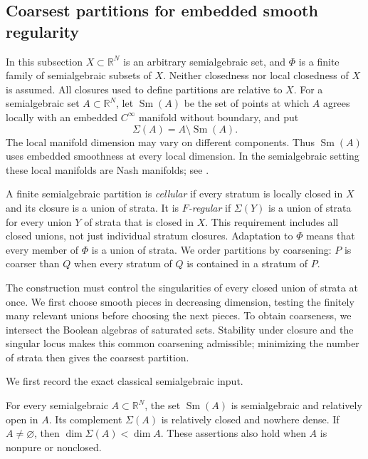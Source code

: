 \subsection{Coarsest partitions for embedded smooth regularity}
\label{subsec:coarsest-embedded-smooth-partitions}

In this subsection $X\subset\mathbb R^N$ is an arbitrary semialgebraic
set, and $\Phi$ is a finite family of semialgebraic subsets of $X$.
Neither closedness nor local closedness of $X$ is assumed.  All closures
used to define partitions are relative to $X$.
For a semialgebraic set $A\subset\mathbb R^N$, let $\operatorname{Sm}(A)$
be the set of points at which $A$ agrees locally with an embedded
$C^\infty$ manifold without boundary, and put
\[
 \Sigma(A)=A\setminus\operatorname{Sm}(A).
\]
The local manifold dimension may vary on different components.
Thus $\operatorname{Sm}(A)$ uses embedded smoothness at every local
dimension.  In the semialgebraic setting these local manifolds are Nash
manifolds; see \cite[pp.~629--630]{Fernando2018}.

A finite semialgebraic partition is \emph{cellular} if every stratum is
locally closed in $X$ and its closure is a union of strata.  It is
\emph{$F$-regular} if $\Sigma(Y)$ is a union of strata for every union
$Y$ of strata that is closed in $X$.  This requirement includes all
closed unions, not just individual stratum closures.  Adaptation to
$\Phi$ means that every member of $\Phi$ is a union of strata.  We order
partitions by coarsening: $P$ is coarser than $Q$ when every stratum of
$Q$ is contained in a stratum of $P$.

The construction must control the singularities of every closed
union of strata at once. We first choose smooth pieces in decreasing
dimension, testing the finitely many relevant unions before choosing
the next pieces. To obtain coarseness, we intersect the Boolean
algebras of saturated sets. Stability under closure and the singular
locus makes this common coarsening admissible; minimizing the number
of strata then gives the coarsest partition.

We first record the exact classical semialgebraic input.

\begin{lemma}
\label{lem:all-dimensional-semialgebraic-smooth-locus}
For every semialgebraic $A\subset\mathbb R^N$, the set
$\operatorname{Sm}(A)$ is semialgebraic and relatively open in $A$.
Its complement $\Sigma(A)$ is relatively closed and nowhere dense.
If $A\ne\varnothing$, then $\dim\Sigma(A)<\dim A$.
These assertions also hold when $A$ is nonpure or nonclosed.
\end{lemma}

